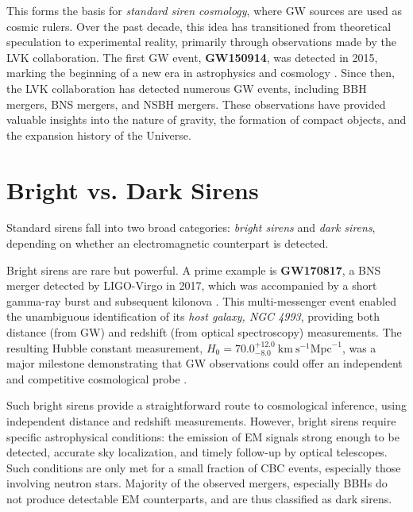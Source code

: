 This forms the basis for \textit{standard siren cosmology}, where \ac{GW} sources are used as cosmic rulers. Over the past decade, this idea has transitioned from theoretical speculation to experimental reality, primarily through observations made by the \acf{LVK} collaboration. The first \ac{GW} event, \textbf{GW150914}, was detected in 2015, marking the beginning of a new era in astrophysics and cosmology \citep{abbott2016gw150914}. Since then, the \ac{LVK} collaboration has detected numerous \ac{GW} events, including \acf{BBH} mergers, \acf{BNS} mergers, and \acf{NSBH} mergers. These observations have provided valuable insights into the nature of gravity, the formation of compact objects, and the expansion history of the Universe.

\newpage
\section{Bright vs. Dark Sirens}
Standard sirens fall into two broad categories: \textit{bright sirens} and \textit{dark sirens}, depending on whether an electromagnetic counterpart is detected.

Bright sirens are rare but powerful. A prime example is \textbf{GW170817}, a \ac{BNS} merger detected by LIGO-Virgo in 2017, which was accompanied by a short gamma-ray burst and subsequent kilonova \citep{LIGOScientific:2017adf}. This multi-messenger event enabled the unambiguous identification of its \textit{host galaxy, NGC 4993}, providing both distance (from \ac{GW}) and redshift (from optical spectroscopy) measurements. The resulting Hubble constant measurement, $H_0 = 70.0^{+12.0}_{-8.0}~\mathrm{km}~\mathrm{s}^{-1}\mathrm{Mpc}^{-1}$, was a major milestone demonstrating that \ac{GW} observations could offer an independent and competitive cosmological probe \citep{LIGOScientific:2017adf}.

Such bright sirens provide a straightforward route to cosmological inference, using independent distance and redshift measurements. However, bright sirens require specific astrophysical conditions: the emission of \ac{EM} signals strong enough to be detected, accurate sky localization, and timely follow-up by optical telescopes. Such conditions are only met for a small fraction of \ac{CBC} events, especially those involving neutron stars. Majority of the observed mergers, especially \acfp{BBH} do not produce detectable \ac{EM} counterparts, and are thus classified as dark sirens.

